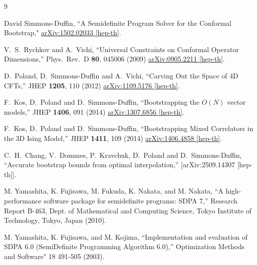 \documentclass[12pt]{article}
\numberwithin{equation}{section}
\begin{document}
\begin{thebibliography}{9}

  David Simmons-Duffin,
  ``A Semidefinite Program Solver for the Conformal Bootstrap,"
  \href{http://arxiv.org/abs/1502.02033}{arXiv:1502.02033 [hep-th]}.

  V.~S.~Rychkov and A.~Vichi,
  ``Universal Constraints on Conformal Operator Dimensions,''
  Phys.\ Rev.\ D {\bf 80}, 045006 (2009)
  \href{http://arxiv.org/abs/0905.2211}{arXiv:0905.2211 [hep-th]}.

  D.~Poland, D.~Simmons-Duffin and A.~Vichi,
  ``Carving Out the Space of 4D CFTs,''
  JHEP {\bf 1205}, 110 (2012)
  \href{http://arXiv.org/abs/1109.5176}{arXiv:1109.5176 [hep-th]}.
  
  F.~Kos, D.~Poland and D.~Simmons-Duffin,
  ``Bootstrapping the $O(N)$ vector models,''
  JHEP {\bf 1406}, 091 (2014)
  \href{http://arXiv.org/abs/1307.6856}{arXiv:1307.6856 [hep-th]}.

  F.~Kos, D.~Poland and D.~Simmons-Duffin,
  ``Bootstrapping Mixed Correlators in the 3D Ising Model,''
  JHEP {\bf 1411}, 109 (2014)
  \href{http://arXiv.org/abs/1406.4858}{arXiv:1406.4858 [hep-th]}.

  C.~H.~Chang, V.~Dommes, P.~Kravchuk, D.~Poland and D.~Simmons-Duffin,
  ``Accurate bootstrap bounds from optimal interpolation,''
  [arXiv:2509.14307 [hep-th]].


  M. Yamashita, K. Fujisawa, M. Fukuda, K. Nakata, and M. Nakata,
  ``A high-performance software package for semidefinite programs: SDPA 7,''
   Research Report B-463, Dept. of Mathematical and Computing Science, Tokyo Institute of Technology, Tokyo, Japan (2010).

  M. Yamashita, K. Fujisawa, and M. Kojima,
  ``Implementation and evaluation of SDPA 6.0 (SemiDefinite Programming Algorithm 6.0),''
  Optimization Methods and Software" 18 491-505 (2003).


\end{thebibliography}
\end{document}
